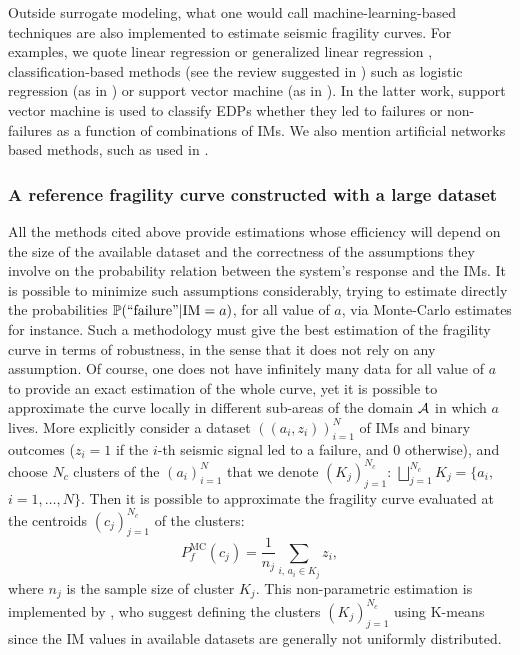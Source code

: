 Outside surrogate modeling, what one would call machine-learning-based techniques are also implemented to estimate seismic fragility curves.
For examples, we quote linear regression or generalized linear regression \citep{lallemant_statistical_2015}, classification-based methods (see the review suggested in \cite{kiani_application_2019}) such as  logistic regression (as in \cite{bernier_fragility_2019}) or support vector machine (as in \cite{sainct_efficient_2020}). In the latter work, support vector machine is used to classify EDPs whether they led to failures or non-failures as a function of combinations of IMs.
We also mention artificial networks based methods, such as used in \cite{mitropoulou_developing_2011,wang_seismic_2018}.
 


\subsubsection{A reference fragility curve constructed with a large dataset}

All the methods cited above provide estimations whose efficiency will depend on the size of the available dataset and the correctness of the assumptions they involve on the probability relation between the system's response and the IMs.
It is possible to minimize such assumptions considerably, trying to estimate directly the probabilities $\mathbb{P}(\text{``failure''}|\text{IM}=a)$, for all value of $a$, via Monte-Carlo estimates for instance.
Such a methodology must give the best estimation of the fragility curve in terms of robustness, in the sense that it does not rely on any assumption. Of course, one does not have infinitely many data for all value of $a$ to provide an exact estimation of the whole curve, yet it is possible to approximate the curve locally in different sub-areas of the domain $\mathcal{A}$ in which $a$ lives.
More explicitly consider a dataset $((a_i,z_i))_{i=1}^{N}$ of IMs and binary outcomes ($z_i=1$ if the $i$-th seismic signal led to a failure, and $0$ otherwise), and choose $N_c$ clusters of the $(a_i)_{i=1}^N$ that we denote $(K_j)_{j=1}^{N_c}$: $\bigsqcup_{j=1}^{N_c}K_j=\{a_i,$ $i=1,\dots,N\}$. Then it is possible to approximate the fragility curve evaluated at the centroids $(c_j)_{j=1}^{N_c}$ of the clusters:
    \begin{equation}
        P_f^{\text{MC}}(c_j) = \frac{1}{n_j}\sum_{i,\, a_i\in K_j}z_i,
    \end{equation}
where $n_j$ is the sample size of cluster $K_j$.
This non-parametric estimation is implemented by \citet{trevlopoulos_parametric_2019}, who suggest defining the clusters $(K_j)_{j=1}^{N_c}$ using K-means since the IM values in available datasets are generally not uniformly distributed.

